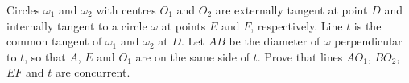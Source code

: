 Circles $\omega_1$ and $\omega_2$ with centres $O_1$ and $O_2$ are externally tangent at point $D$ and internally tangent to a circle $\omega$ at points $E$ and $F$, respectively. Line $t$ is the common tangent of $\omega_1$ and $\omega_2$ at $D$. Let $AB$ be the diameter of $\omega$ perpendicular to $t$, so that $A$, $E$ and $O_1$ are on the same side of $t$. Prove that lines $AO_1$, $BO_2$, $EF$ and $t$ are concurrent.
